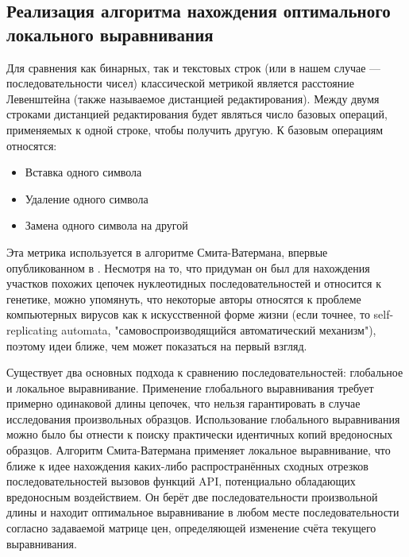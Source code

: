\subsection {Реализация алгоритма нахождения оптимального локального выравнивания}
Для сравнения как бинарных, так и текстовых строк (или в нашем случае --- последовательности чисел) классической метрикой является расстояние Левенштейна (также называемое дистанцией редактирования). Между двумя строками дистанцией редактирования будет являться число базовых операций, применяемых к одной строке, чтобы получить другую. К базовым операциям относятся:
\begin {itemize}
	\item Вставка одного символа
	\item Удаление одного символа
	\item Замена одного символа на другой
\end {itemize}
Эта  метрика используется в алгоритме Смита-Ватермана, впервые опубликованном в \cite{LOCALALIGNMENT}. Несмотря на то, что придуман он был для нахождения участков похожих цепочек нуклеотидных последовательностей и относится к генетике, можно упомянуть, что некоторые авторы \cite{BLACKBOOK} относятся к проблеме компьютерных вирусов как к искусственной форме жизни (если точнее, то self-replicating automata, "самовоспроизводящийся автоматический механизм"), поэтому идеи ближе, чем может показаться на первый взгляд.

Существует два основных подхода к сравнению последовательностей: глобальное и локальное выравнивание. Применение глобального выравнивания требует примерно одинаковой длины цепочек, что нельзя гарантировать в случае исследования произвольных образцов. Использование глобального выравнивания можно было бы отнести к поиску практически идентичных копий вредоносных образцов. Алгоритм Смита-Ватермана применяет локальное выравнивание, что ближе к идее нахождения каких-либо распространённых сходных отрезков последовательностей вызовов функций API, потенциально обладающих вредоносным воздействием. Он берёт две последовательности произвольной длины и находит оптимальное выравнивание в любом месте последовательности согласно задаваемой матрице цен, определяющей изменение счёта текущего выравнивания. 

